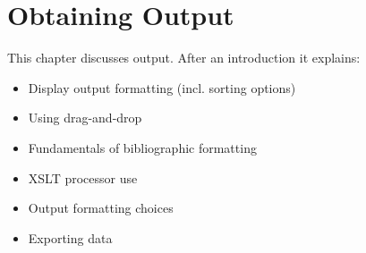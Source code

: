 
\chapter{Obtaining Output}
\label{cha:rgout}

This chapter discusses output. After an introduction it explains:
\begin{itemize}
\item Display output formatting (incl. sorting options)
\item Using drag-and-drop 
\item Fundamentals of bibliographic formatting
\item XSLT processor use
\item Output formatting choices 
\item Exporting data
\end{itemize}








